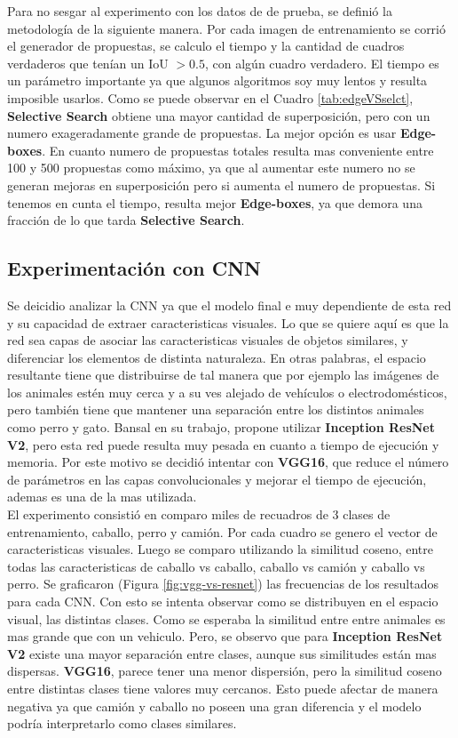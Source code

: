 Para no sesgar al experimento con los datos de de prueba, se definió la metodología de la siguiente manera. Por cada imagen de entrenamiento se corrió el generador de propuestas, se calculo el tiempo y la cantidad de cuadros verdaderos que tenían un IoU $> 0.5$, con algún cuadro verdadero. El tiempo es un parámetro importante ya que algunos algoritmos soy muy lentos y resulta imposible usarlos. Como se puede observar en el Cuadro \ref{tab:edgeVSselct}, \textbf{Selective Search} obtiene una mayor cantidad de superposición, pero con un numero exageradamente grande de propuestas. La mejor opción es usar \textbf{Edge-boxes}. En cuanto numero de propuestas totales resulta mas conveniente entre 100 y 500 propuestas como máximo, ya que al aumentar este numero no se generan mejoras en superposición pero si aumenta el numero de propuestas. Si tenemos en cunta el tiempo, resulta mejor \textbf{Edge-boxes}, ya que demora una fracción de lo que tarda \textbf{Selective Search}.\\

\subsection{Experimentación con CNN} \label{ssec:experimentacionconcnn}
Se deicidio analizar la CNN ya que el modelo final e muy dependiente de esta red y su capacidad de extraer caracteristicas visuales. Lo que se quiere aquí es que la red sea capas de asociar las caracteristicas visuales de objetos similares, y diferenciar los elementos de distinta naturaleza. En otras palabras, el espacio resultante tiene que distribuirse de tal manera que por ejemplo las imágenes de los animales estén muy cerca y a su ves alejado de vehículos o electrodomésticos, pero también tiene que mantener una separación entre los distintos animales como perro y gato. Bansal en su trabajo, propone utilizar \textbf{Inception ResNet V2}, pero esta red puede resulta muy pesada en cuanto a tiempo de ejecución y memoria. Por este motivo se decidió intentar con \textbf{VGG16}, que reduce el número de parámetros en las capas convolucionales y mejorar el tiempo de ejecución, ademas es una de la mas utilizada.\\

El experimento consistió en comparo miles de recuadros de 3 clases de entrenamiento, caballo, perro y camión.  Por cada cuadro se genero el vector de caracteristicas visuales. Luego se comparo utilizando la similitud coseno, entre todas las caracteristicas de caballo vs caballo, caballo vs camión y caballo vs perro. Se graficaron (Figura \ref{fig:vgg-vs-resnet}) las frecuencias de los resultados para cada CNN. Con esto se intenta observar como se distribuyen en el espacio visual, las distintas clases. Como se esperaba la similitud entre entre animales es mas grande que con un vehiculo. Pero, se observo que para \textbf{Inception ResNet V2} existe una mayor separación entre clases, aunque sus similitudes están mas dispersas. \textbf{VGG16}, parece tener una menor dispersión, pero la similitud coseno entre distintas clases tiene valores muy cercanos. Esto puede afectar de manera negativa ya que camión y caballo no poseen una gran diferencia y el modelo podría interpretarlo como clases similares.\\

